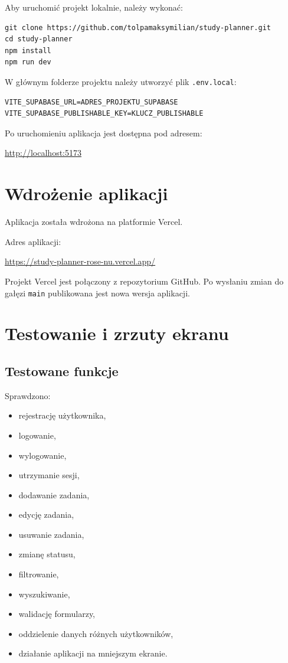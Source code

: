 \documentclass[12pt,a4paper]{article}
\begin{document}
Aby uruchomić projekt lokalnie, należy wykonać:

\begin{verbatim}
git clone https://github.com/tolpamaksymilian/study-planner.git
cd study-planner
npm install
npm run dev
\end{verbatim}

W głównym folderze projektu należy utworzyć plik \texttt{.env.local}:

\begin{verbatim}
VITE_SUPABASE_URL=ADRES_PROJEKTU_SUPABASE
VITE_SUPABASE_PUBLISHABLE_KEY=KLUCZ_PUBLISHABLE
\end{verbatim}

Po uruchomieniu aplikacja jest dostępna pod adresem:

\url{http://localhost:5173}

\section{Wdrożenie aplikacji}

Aplikacja została wdrożona na platformie Vercel.

Adres aplikacji:

\url{https://study-planner-rose-nu.vercel.app/}

Projekt Vercel jest połączony z repozytorium GitHub. Po wysłaniu zmian do gałęzi \texttt{main} publikowana jest nowa wersja aplikacji.

\section{Testowanie i zrzuty ekranu}

\subsection{Testowane funkcje}

Sprawdzono:

\begin{itemize}[leftmargin=*]
    \item rejestrację użytkownika,
    \item logowanie,
    \item wylogowanie,
    \item utrzymanie sesji,
    \item dodawanie zadania,
    \item edycję zadania,
    \item usuwanie zadania,
    \item zmianę statusu,
    \item filtrowanie,
    \item wyszukiwanie,
    \item walidację formularzy,
    \item oddzielenie danych różnych użytkowników,
    \item działanie aplikacji na mniejszym ekranie.
\end{itemize}
\end{document}
